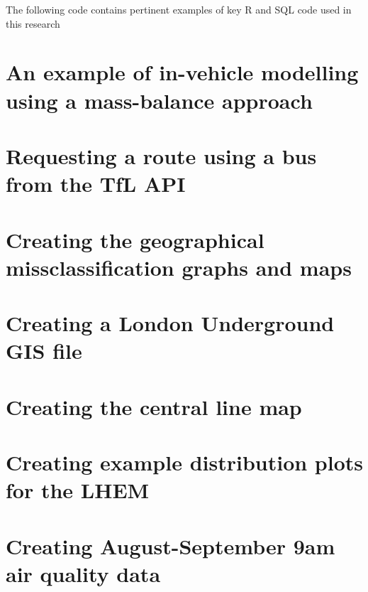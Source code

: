 The following code contains pertinent examples of key R and SQL code used in this research

\section{An example of in-vehicle modelling using a mass-balance approach}
\label{code:in_vehicle_example}


\newpage
\section{Requesting a route using a bus from the TfL API}
\label{code:tfl_bus_request}


\newpage
\section{Creating the geographical missclassification graphs and maps}
\label{code:create_geographical_results}


\newpage
\section{Creating a London Underground GIS file}
\label{code:make_tube_network_from_scratch}


\newpage
\section{Creating the central line map}
\label{code:fake_tube_map_central_line}


\newpage
\section{Creating example distribution plots for the LHEM}
\label{code:example_distribution_plot}


\newpage
\section{Creating August-September 9am air quality data}
\label{code:make_cmaq_aug_sept_file}





